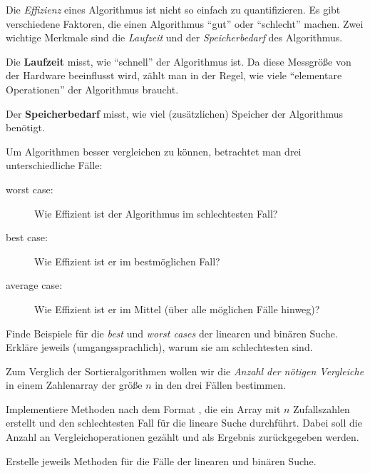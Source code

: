 \documentclass[10pt, a4paper, ngerman]{arbeitsblatt}
\begin{document}
\ReiheTitel

\begin{infobox}\small
	Die \emph{Effizienz} eines Algorithmus ist nicht so einfach zu quantifizieren.
	Es gibt verschiedene Faktoren, die einen Algorithmus \enquote{gut} oder \enquote{schlecht}
	machen. Zwei wichtige Merkmale sind die \emph{Laufzeit} und der \emph{Speicherbedarf}
	des Algorithmus.

	Die \textbf{Laufzeit} misst, wie \enquote{schnell} der Algorithmus ist. Da diese Messgröße
	von der Hardware beeinflusst wird, zählt man in der Regel, wie viele \enquote{elementare
	Operationen} der Algorithmus braucht.

	Der \textbf{Speicherbedarf} misst, wie viel (zusätzlichen) Speicher der Algorithmus benötigt.

	\smallskip
	Um Algorithmen besser vergleichen zu können, betrachtet man drei unterschiedliche
	Fälle:
	\begin{description}
		\item[worst case:] Wie Effizient ist der Algorithmus im schlechtesten Fall?
		\item[best case:] Wie Effizient ist er im bestmöglichen Fall?
		\item[average case:] Wie Effizient ist er im Mittel (über alle möglichen Fälle hinweg)?
	\end{description}
	\smallskip
\end{infobox}

\begin{aufgabe}[icon=\iconHeft]
	\label{aufg:cases-ermitteln}
	Finde Beispiele für die \emph{best} und \emph{worst cases} der linearen und binären Suche. Erkläre
	jeweils (umgangssprachlich), warum sie am schlechtesten sind.
\end{aufgabe}

\begin{aufgabe}[icon=\iconComputer]
	\label{aufg:cases-zaehlen}
	Zum Verglich der Sortieralgorithmen wollen wir die \emph{Anzahl der nötigen Vergleiche}
	in einem Zahlenarray der größe $n$ in den drei Fällen bestimmen.


	Implementiere Methoden nach dem Format , die ein
	Array mit $n$ Zufallszahlen erstellt und den schlechtesten Fall für die lineare Suche durchführt.
	Dabei soll die Anzahl an Vergleichoperationen gezählt und als Ergebnis zurückgegeben werden.

	Erstelle jeweils Methoden für die Fälle der linearen und binären Suche.

\end{aufgabe}
\end{document}
